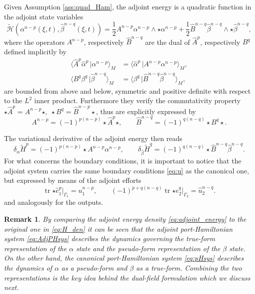 \documentclass{elsarticle}
\newcommand{\revTwo}[1]{{\color{black}#1}}
\newtheorem{remark}{Remark}
\DeclareMathOperator{\tr}{tr}
\newcommand*{\dual}[1]{\ensuremath{\widehat{#1}}}
\newcommand{\dualpr}[3][]{\ensuremath{\langle #2 \, \vert #3 \rangle_{#1}}}
\begin{document}
Given Assumption \ref{ass:quad_Ham}, the adjoint energy is a quadratic function in the adjoint state variables
\begin{equation}\label{eq:adjoint_energy}
    \widetilde{\mathcal{H}}({\alpha}^{n-p}(\xi, t), \dual{\beta}^{n-q}(\xi, t)) = \frac{1}{2} {A}^{n-p} {\alpha}^{n-p} \wedge {\star {\alpha}^{n-p}} + \frac{1}{2} \dual{B}^{n-q} \dual{\beta}^{n-q} \wedge {\star  \dual{\beta}^{n-q}},
\end{equation}
where the operators ${A}^{n-p}$, respectively $\dual{B}^{n-q}$ are the dual of $\dual{A}^p$, respectively ${B}^{q}$ defined implicitly by
\begin{equation}
\begin{aligned}
    \dualpr[M]{\dual{A}^p\dual{\alpha}^{p}}{{\alpha}^{n-p}} &= \dualpr[M]{\dual{\alpha}^p}{{A}^{n-p} {\alpha}^{n-p}}, \\
    \dualpr[M]{B^q\beta^{q}}{\dual{\beta}^{n-q}} &= \dualpr[M]{\beta^{q}}{\dual{B}^{n-q} \dual{\beta}^{n-q}},
\end{aligned}
\end{equation}
are bounded from above and below, symmetric and positive definite with respect to the $L^2$ inner product. Furthermore they verify the commutativity property $\star \dual{A}^p = {A}^{n-p} \star, \; \star B^q = \dual{B}^{n-p} \star$, thus are explicitly expressed by
\begin{equation}
    {A}^{n-p} = (-1)^{p(n-p)} \star \dual{A}^{p} \star, \qquad \dual{B}^{n-q} = (-1)^{q(n-q)} \star B^q \star.
\end{equation}

The variational derivative of the adjoint energy then reads
\begin{equation}
    \delta_{\alpha} \widetilde{H}^p = (-1)^{p(n-p)} \star  {A}^{n-p}{\alpha}^{n-p}, \qquad
    \delta_{\dual{\beta}} \widetilde{H}^q = (-1)^{q(n-q)} \star \dual{B}^{n-q} \dual{\beta}^{n-q}.
\end{equation} 
For what concerns the boundary conditions, it is important to notice that the adjoint system carries the same boundary conditions \eqref{eq:u} as the \revTwo{canonical} one, but expressed by means of the adjoint efforts
 \begin{equation}
    \tr {\star \dual{e}^p_1} \vert_{\Gamma_1} = u^{n-p}_1, \qquad
    (-1)^{p+q(n-q)} \tr {\star {e}^q_2} \vert_{\Gamma_2} = \dual{u}^{n-q}_2.
 \end{equation}
and analogously for the outputs.

\begin{remark}
	By comparing the adjoint energy density \eqref{eq:adjoint_energy} to the original one in \eqref{eq:H_den} it can be seen that the adjoint port-Hamiltonian system \eqref{eq:AdjPHsys} describes the dynamics governing the \textit{true-form} representation of the $\alpha$ state and the \textit{pseudo-form} representation of the $\beta$ state. On the other hand, the canonical port-Hamiltonian system \eqref{eq:pHsys} describes the dynamics of $\alpha$ as a \textit{pseudo-form} and $\beta$ as a \textit{true-form}. Combining the two representations is the key idea behind the dual-field formulation which we discuss next.
\end{remark}
\end{document}
